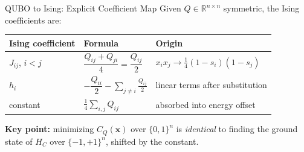 \documentclass{beamer}
\begin{document}
\begin{frame}{QUBO to Ising: Explicit Coefficient Map}
Given $Q\in\mathbb{R}^{n\times n}$ symmetric, the Ising coefficients are:

\medskip

\begin{center}
\begin{tabular}{lll}
\hline
\textbf{Ising coefficient} & \textbf{Formula} & \textbf{Origin} \\
\hline
$J_{ij}$, $i<j$ &
$\dfrac{Q_{ij}+Q_{ji}}{4} = \dfrac{Q_{ij}}{2}$ &
$x_ix_j \to \tfrac{1}{4}(1-s_i)(1-s_j)$\\[8pt]
$h_i$ &
$-\dfrac{Q_{ii}}{2} - \displaystyle\sum_{j\neq i}\frac{Q_{ij}}{2}$ &
linear terms after substitution \\[8pt]
constant & $\displaystyle\frac{1}{4}\sum_{i,j}Q_{ij}$ & absorbed into energy offset \\
\hline
\end{tabular}
\end{center}

\medskip

\textbf{Key point:} minimizing $C_Q(\mathbf{x})$ over
$\{0,1\}^n$ is \emph{identical} to finding the ground state of $H_C$
over $\{-1,+1\}^n$, shifted by the constant.
\end{frame}

\end{document}
